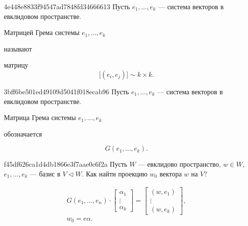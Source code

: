 \begin{note}{4e448e8833f94547ad7848fd34666613}
    Пусть \({ e_1, \ldots, e_k }\) --- система векторов в евклидовом пространстве.
    \begin{icloze}{2}Матрицей Грема системы \({ e_1, \ldots, e_k }\)\end{icloze} называют \begin{icloze}{1}матрицу
    \[
        \Big[ \left( e_i, e_j \right) \Big] \sim k \times k.
    \]\end{icloze}
\end{note}

\begin{note}{3bff6be501ed49109d5041f018ecab96}
    Пусть \({ e_1, \ldots, e_k }\) --- система векторов в евклидовом пространстве.
    \begin{icloze}{2}Матрица Грема системы \({ e_1, \ldots, e_k }\)\end{icloze} обозначается
    \begin{icloze}{1}
        \[
            G(e_1, \ldots, e_k).
        \]
    \end{icloze}
\end{note}

\begin{note}{f45df626ca1d4db1866e3f7aae0c6f2a}
    Пусть \({ W }\) --- евклидово пространство, \({ w \in W }\), \({ e_1, \ldots, e_k }\) --- базис в \({ V \triangleleft W }\).
    Как найти проекцию \({ w_0 }\) вектора \({ w }\) на \({ V }\)?

    \begin{cloze}{1}
        \[
            \begin{gathered}
                G(e_1, \ldots, e_n) \cdot \begin{bmatrix}
                    \alpha_1 \\ \vdots \\ \alpha_k
                \end{bmatrix}
                =
                \begin{bmatrix}
                    (w, e_1) \\ \vdots \\ (w, e_k)
                \end{bmatrix}, \\
                w_0 = e\alpha.
            \end{gathered}
        \]
    \end{cloze}
\end{note}



